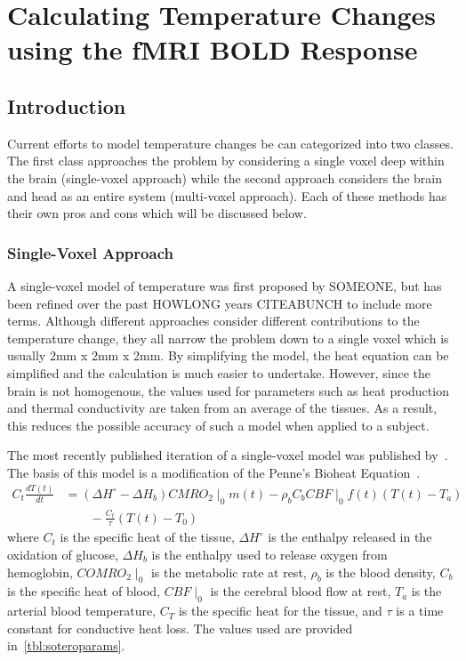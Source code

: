 \chapter{Calculating Temperature Changes using the fMRI BOLD Response}
    
  \section{\label{sec:tempmodelintro} Introduction}
  Current efforts to model temperature changes be can categorized into two classes.  The first class approaches the problem by considering a single voxel deep within the brain (single-voxel approach) while the second approach considers the brain and head as an entire system (multi-voxel approach).  Each of these methods has their own pros and cons which will be discussed below.
    \subsection{\label{sec:singlevox} Single-Voxel Approach}
    A single-voxel model of temperature was first proposed by SOMEONE, but has been refined over the past HOWLONG years CITEABUNCH to include more terms.  Although different approaches consider different contributions to the temperature change, they all narrow the problem down to a single voxel which is usually 2mm x 2mm x 2mm.  By simplifying the model, the heat equation can be simplified and the calculation is much easier to undertake.  However, since the brain is not homogenous, the values used for parameters such as heat production and thermal conductivity are taken from an average of the tissues.  As a result, this reduces the possible accuracy of such a model when applied to a subject.
    
    The most recently published iteration of a single-voxel model was published by~\citet{sotero2011}.  The basis of this model is a modification of the Penne's Bioheat Equation~\citep{pennes, sotero2011}.
    \begin{align}
      \label{eq:bioheat}
      C_t \frac{dT(t)}{dt} &= (\Delta H^{\circ}-\Delta H_{b}) CMRO_{2}\mid_{0} m(t) - \rho_{b} C_{b} CBF\mid_{0} f(t) (T(t) - T_{a}) \nonumber \\
      &\qquad {} - \frac{C_{t}}{\tau} (T(t)-T_{0})
    \end{align}
    where $C_t$ is the specific heat of the tissue, $\Delta H^{\circ}$ is the enthalpy released in the oxidation of glucose, $\Delta H_b$ is the enthalpy used to release oxygen from hemoglobin, $COMRO_2 \mid_0$ is the metabolic rate at rest, $\rho_b$ is the blood density, $C_b$ is the specific heat of blood, $CBF\mid_0$ is the cerebral blood flow at rest, $T_a$ is the arterial blood temperature, $C_T$ is the specific heat for the tissue, and $\tau$ is a time constant for conductive heat loss.  The values used are provided in~\cref{tbl:soteroparams}.
    
